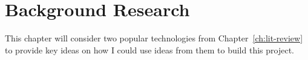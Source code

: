 \chapter{Background Research}

This chapter will consider two popular technologies from Chapter~\ref{ch:lit-review} to provide key ideas on how I could use ideas from them to build this project.


